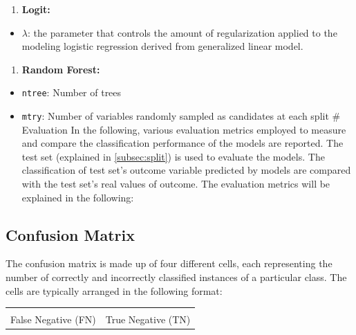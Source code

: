\documentclass{article}
\providecommand{\tightlist}{%
  \setlength{\itemsep}{0pt}\setlength{\parskip}{0pt}}
\begin{document}
\begin{enumerate}
\def\labelenumi{\arabic{enumi}.}
\tightlist
\item
  \textbf{Logit:}
\end{enumerate}

\begin{itemize}
\tightlist
\item
  \(\lambda\): the parameter that controls the amount of regularization
  applied to the modeling logistic regression derived from generalized
  linear model.
\end{itemize}

\begin{enumerate}
\def\labelenumi{\arabic{enumi}.}
\setcounter{enumi}{1}
\tightlist
\item
  \textbf{Random Forest:}
\end{enumerate}

\begin{itemize}
\tightlist
\item
  \texttt{ntree}: Number of trees
\item
  \texttt{mtry}: Number of variables randomly sampled as candidates at
  each split \# Evaluation \label{sec:evaluation} In the following,
  various evaluation metrics employed to measure and compare the
  classification performance of the models are reported. The test set
  (explained in \ref{subsec:split}) is used to evaluate the models. The
  classification of test set's outcome variable predicted by models are
  compared with the test set's real values of outcome. The evaluation
  metrics will be explained in the following:
\end{itemize}

\hypertarget{confusion-matrix}{%
\subsection{Confusion Matrix}\label{confusion-matrix}}

The confusion matrix is made up of four different cells, each
representing the number of correctly and incorrectly classified
instances of a particular class. The cells are typically arranged in the
following format:

\begin{table}[!h]
\centering
\begin{tabular}{ll}
\toprule
\cellcolor{gray!6}{True Positive (TP)} & \cellcolor{gray!6}{False Positive (FP)}\\
False Negative (FN) & True Negative (TN)\\
\bottomrule
\end{tabular}
\end{table}
\end{document}
